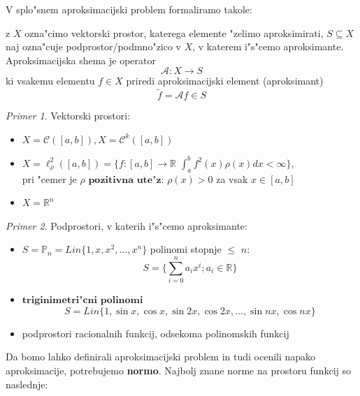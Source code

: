 \documentclass[a4paper,12pt]{article}
\theoremstyle{definition}
\theoremstyle{remark}
\newtheorem*{ex}{Primer}
\newcommand{\R}{\mathbb{R}}
\newcommand{\Pp}{\mathbb{P}}
\begin{document}
V splo"snem aproksimacijski problem formaliramo takole:

z $X$ ozna"cimo vektorski prostor, katerega elemente "zelimo aproksimirati, $S \subseteq X$ naj ozna"cuje podprostor/podmno"zico v $X$, v katerem i"s"cemo aproksimante. Aproksimacijska shema je operator 
\begin{equation*}
    \mathscr{A}\colon X \to S
\end{equation*}
ki vsakemu elementu $f \in X$ priredi aproksimacijski element (aproksimant)
\begin{equation*}
    \tilde{f} = \mathscr{A} f \in S
\end{equation*}

\begin{ex}
    Vektorski prostori:
    \begin{itemize}
        \item $X = \mathscr{C}([a, b]), X = \mathscr{C}^k([a, b])$
        \item $X = \ell^{2}_{\rho}([a, b]) = \{f\colon[a, b] \to \R$ $\int_{a}^{b} f^2(x)\rho(x) dx < \infty \}$,\\
        pri "cemer je $\rho \textbf{ pozitivna ute"z: } \rho (x) > 0$ za vsak $x \in [a, b]$
        \item $X = \R ^n$
    \end{itemize}
\end{ex}

\begin{ex}
    Podprostori, v katerih i"s"cemo aproksimante:
    
    \begin{itemize}
        \item $S = \Pp_n = Lin\{1, x, x^2, \dots, x^n\}$ polinomi stopnje $\leq$ $n$:
        \begin{equation*}
            S = \{ \sum_{i = 0}^{n} a_i x^i; a_i \in \R \}
        \end{equation*}
        \item $\textbf{triginimetri"cni polinomi}$
        \begin{equation*}
            S = Lin\{1, \sin x, \cos x, \sin 2x, \cos 2x, \dots, \sin nx, \cos nx\}
        \end{equation*}
        \item podprostori racionalnih funkcij, odsekoma polinomskih funkcij
    \end{itemize}
\end{ex}

Da bomo lahko definirali aproksimacijski problem in tudi ocenili napako aproksimacije, potrebujemo \textbf{normo}. Najbolj znane norme na prostoru funkcij so naslednje:
\end{document}
